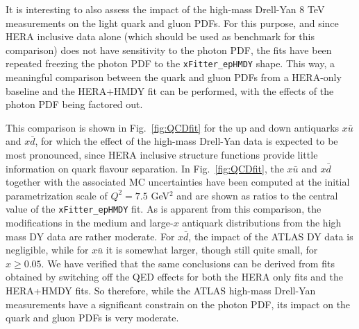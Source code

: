 It is interesting to also assess the impact of the high-mass Drell-Yan 8 TeV measurements on
the light quark and gluon PDFs.
%
For this purpose, and since HERA inclusive data alone (which should be used as
benchmark for this comparison) does not have sensitivity to the photon
PDF, the fits have been repeated freezing the photon PDF to the
{\tt xFitter\_epHMDY} shape.
%
This way, 
a meaningful comparison between the quark and gluon PDFs
from a HERA-only
baseline and the HERA+HMDY fit can be performed, with the effects of
the photon PDF being factored out.

This comparison is shown in Fig.~\ref{fig:QCDfit} for the up and down
antiquarks $x\bar{u}$ and $x\bar{d}$, for which the effect of the high-mass Drell-Yan data is
expected to be most pronounced, since HERA inclusive structure functions
provide little information on quark flavour separation.
%
In Fig.~\ref{fig:QCDfit}, the $x\bar{u}$ and $x\bar{d}$ together
with the associated MC uncertainties have been computed
at the initial parametrization scale of $Q^2=7.5$ GeV$^2$ and
are shown as ratios to the central value of the {\tt xFitter\_epHMDY}
fit.
%
As is apparent from this comparison, the modifications in the medium
and large-$x$ antiquark distributions from the high mass DY data are
rather moderate.
%
For $x\bar{d}$, the impact of the ATLAS DY data is negligible, while
for $x\bar{u}$ it is somewhat larger, though still quite small,
for $x\ge 0.05$.
%
We have verified that the same conclusions can be derived
from fits obtained by switching
off the QED effects for both the HERA only fits and the HERA+HMDY fits.
%
So therefore, while the ATLAS high-mass Drell-Yan measurements have a significant constrain
on the photon PDF, its impact on the quark and gluon PDFs is very moderate.

